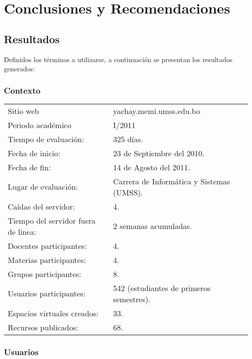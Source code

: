 \chapter{Conclusiones y Recomendaciones}

\section{Resultados}
Definidos los términos a utilizarse, a continuación se presentan los resultados
generados:

\subsection{Contexto}
\begin{center}
\begin{tabular}{|l|l|}
\hline
Sitio web & yachay.memi.umss.edu.bo \\
Periodo académico & I/2011 \\
Tiempo de evaluación: & 325 días. \\
Fecha de inicio: & 23 de Septiembre del 2010. \\
Fecha de fin: & 14 de Agosto del 2011. \\
Lugar de evaluación: & Carrera de Informática y Sistemas (UMSS). \\
Caídas del servidor: & 4. \\
Tiempo del servidor fuera de linea: & 2 semanas acumuladas. \\
Docentes participantes: & 4. \\
Materias participantes: & 4. \\
Grupos participantes: & 8. \\
Usuarios participantes: & 542 (estudiantes de primeros semestres). \\
Espacios virtuales creados: & 33. \\
Recursos publicados: & 68. \\
\hline
\end{tabular}
\end{center}

\subsection{Usuarios}


